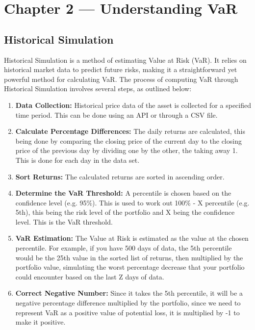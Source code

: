 \documentclass{article}
\begin{document}
\newpage

\section{Chapter 2 --- Understanding VaR}

\subsection{Historical Simulation}

Historical Simulation is a method of estimating Value at Risk (VaR). It relies on historical market data to predict future risks, making it a straightforward yet powerful method for calculating VaR. The process of computing VaR through Historical Simulation involves several steps, as outlined below:

\begin{enumerate}
    \item \textbf{Data Collection:} Historical price data of the asset is collected for a specified time period. This can be done using an API or through a CSV file.
    \item \textbf{Calculate Percentage Differences:} The daily returns are calculated, this being done by comparing the closing price of the current day to the closing price of the previous day by dividing one by the other, the taking away 1. This is done for each day in the data set.
    \item \textbf{Sort Returns:} The calculated returns are sorted in ascending order.
    \item \textbf{Determine the VaR Threshold:} A percentile is chosen based on the confidence level (e.g. 95\%). This is used to work out 100\% - X percentile (e.g. 5th), this being the risk level of the portfolio and X being the confidence level. This is the VaR threshold.
    \item \textbf{VaR Estimation:} The Value at Risk is estimated as the value at the chosen percentile. For example, if you have 500 days of data, the 5th percentile would be the 25th value in the sorted list of returns, then multiplied by the portfolio value, simulating the worst percentage decrease that your portfolio could encounter based on the last Z days of data.
    \item \textbf{Correct Negative Number:} Since it takes the 5th percentile, it will be a negative percentage difference multiplied by the portfolio, since we need to represent VaR as a positive value of potential loss, it is multiplied by -1 to make it positive.
\end{enumerate}
\end{document}
